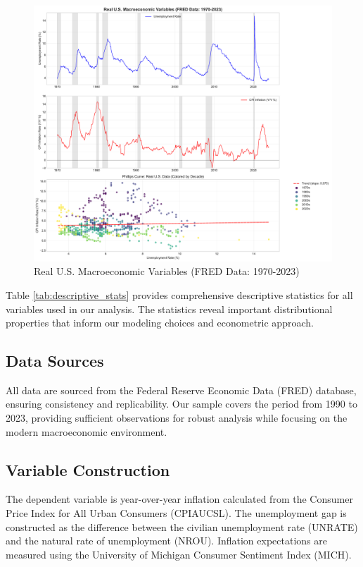 \documentclass[12pt]{article}
\begin{document}
\begin{figure}[H]
\centering
\includegraphics[width=\textwidth]{../figures/time_series_overview.pdf}
\caption{Real U.S. Macroeconomic Variables (FRED Data: 1970-2023)}
\label{fig:time_series}
\end{figure}

Table \ref{tab:descriptive_stats} provides comprehensive descriptive statistics for all variables used in our analysis. The statistics reveal important distributional properties that inform our modeling choices and econometric approach.



\subsection{Data Sources}

All data are sourced from the Federal Reserve Economic Data (FRED) database, ensuring consistency and replicability. Our sample covers the period from 1990 to 2023, providing sufficient observations for robust analysis while focusing on the modern macroeconomic environment.

\subsection{Variable Construction}

The dependent variable is year-over-year inflation calculated from the Consumer Price Index for All Urban Consumers (CPIAUCSL). The unemployment gap is constructed as the difference between the civilian unemployment rate (UNRATE) and the natural rate of unemployment (NROU). Inflation expectations are measured using the University of Michigan Consumer Sentiment Index (MICH).
\end{document}
